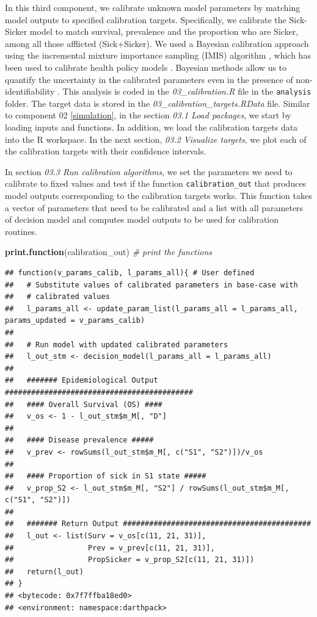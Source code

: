 \documentclass[]{book}
\newenvironment{Shaded}{\begin{snugshade}}{\end{snugshade}}
\newcommand{\KeywordTok}[1]{\textcolor[rgb]{0.13,0.29,0.53}{\textbf{#1}}}
\newcommand{\CommentTok}[1]{\textcolor[rgb]{0.56,0.35,0.01}{\textit{#1}}}
\newcommand{\NormalTok}[1]{#1}
\begin{document}
In this third component, we calibrate unknown model parameters by
matching model outputs to specified calibration targets. Specifically,
we calibrate the Sick-Sicker model to match survival, prevalence and the
proportion who are Sicker, among all those afflicted (Sick+Sicker). We
used a Bayesian calibration approach using the incremental mixture
importance sampling (IMIS) algorithm \citep{Steele2006}, which has been
used to calibrate health policy models \citep[\citet{Menzies2017},
\citet{Rutter2018}]{Raftery2010}. Bayesian methods allow us to quantify
the uncertainty in the calibrated parameters even in the presence of
non-identifiability \citep{Alarid-Escudero2018b}. This analysis is coded
in the \emph{03\_calibration.R} file in the \texttt{analysis} folder.
The target data is stored in the \emph{03\_calibration\_targets.RData}
file. Similar to component 02 \ref{simulation}, in the section
\emph{03.1 Load packages}, we start by loading inputs and functions. In
addition, we load the calibration targets data into the R workspace. In
the next section, \emph{03.2 Visualize targets}, we plot each of the
calibration targets with their confidence intervals.

In section \emph{03.3 Run calibration algorithms}, we set the parameters
we need to calibrate to fixed values and test if the function
\texttt{calibration\_out} that produces model outputs corresponding to
the calibration targets works. This function takes a vector of
parameters that need to be calibrated and a list with all parameters of
decision model and computes model outputs to be used for calibration
routines.

\begin{Shaded}
\begin{Highlighting}[]
\KeywordTok{print.function}\NormalTok{(calibration_out) }\CommentTok{# print the functions}
\end{Highlighting}
\end{Shaded}

\begin{verbatim}
## function(v_params_calib, l_params_all){ # User defined
##   # Substitute values of calibrated parameters in base-case with 
##   # calibrated values
##   l_params_all <- update_param_list(l_params_all = l_params_all, params_updated = v_params_calib)
##   
##   # Run model with updated calibrated parameters
##   l_out_stm <- decision_model(l_params_all = l_params_all)
##   
##   ####### Epidemiological Output ###########################################
##   #### Overall Survival (OS) ####
##   v_os <- 1 - l_out_stm$m_M[, "D"]
##   
##   #### Disease prevalence #####
##   v_prev <- rowSums(l_out_stm$m_M[, c("S1", "S2")])/v_os
##   
##   #### Proportion of sick in S1 state #####
##   v_prop_S2 <- l_out_stm$m_M[, "S2"] / rowSums(l_out_stm$m_M[, c("S1", "S2")])
##   
##   ####### Return Output ###########################################
##   l_out <- list(Surv = v_os[c(11, 21, 31)],
##                 Prev = v_prev[c(11, 21, 31)],
##                 PropSicker = v_prop_S2[c(11, 21, 31)])
##   return(l_out)
## }
## <bytecode: 0x7f7ffba18ed0>
## <environment: namespace:darthpack>
\end{verbatim}
\end{document}
